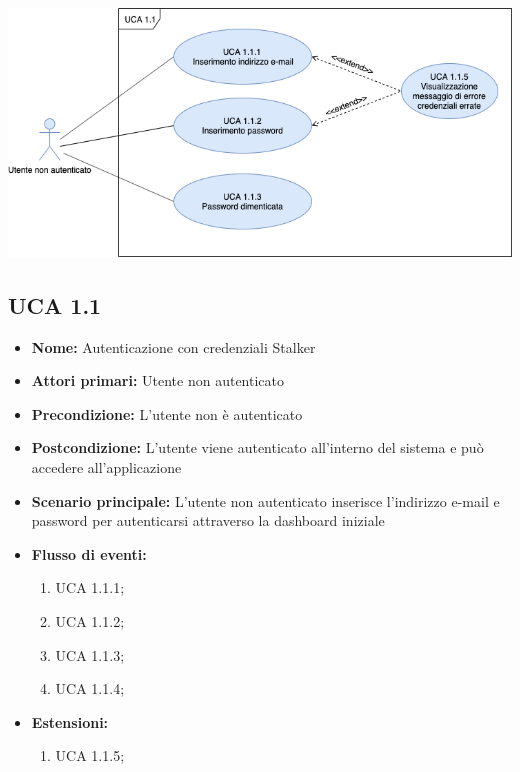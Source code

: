 \documentclass[a4paper, oneside, dvipsnames, table]{article} %
\begin{document}
\newpage
\centering\includegraphics[scale=0.4]{Login.png}
\subsection{UCA 1.1}%
\begin{itemize}
\item \textbf{Nome:} Autenticazione con credenziali Stalker
\item \textbf{Attori primari:} Utente non autenticato
\item \textbf{Precondizione:} L’utente non è autenticato
\item \textbf{Postcondizione:} L’utente viene autenticato all’interno del sistema e può accedere all'applicazione
\item \textbf{Scenario principale:} L’utente non autenticato inserisce l’indirizzo e-mail e password per autenticarsi attraverso la dashboard iniziale%
\item \textbf{Flusso di eventi:} %
  \begin{enumerate}
        \item UCA 1.1.1;
        \item UCA 1.1.2;
        \item UCA 1.1.3;
        \item UCA 1.1.4;
    \end{enumerate}
\item \textbf{Estensioni:}
	\begin{enumerate}
		\item UCA 1.1.5;
	\end{enumerate}
\end{itemize}
\end{document}

